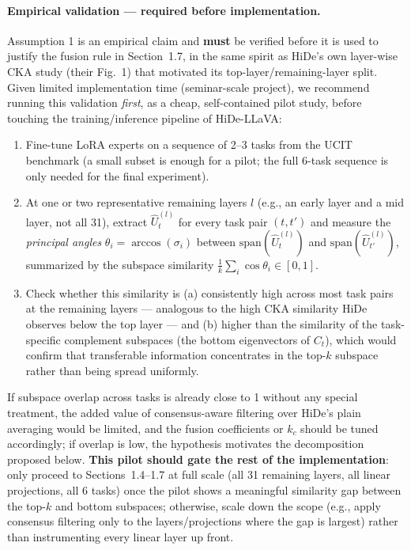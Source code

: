 \documentclass[a4paper]{article}
\begin{document}
\paragraph{Empirical validation — required before implementation.} Assumption 1 is an empirical claim and \textbf{must} be verified before it is used to justify the fusion rule in Section~1.7, in the same spirit as HiDe's own layer-wise CKA study (their Fig.~1) that motivated its top-layer/remaining-layer split. Given limited implementation time (seminar-scale project), we recommend running this validation \emph{first}, as a cheap, self-contained pilot study, before touching the training/inference pipeline of HiDe-LLaVA:
\begin{enumerate}[label=(\roman*)]
\item Fine-tune LoRA experts on a sequence of 2--3 tasks from the UCIT benchmark (a small subset is enough for a pilot; the full 6-task sequence is only needed for the final experiment).
\item At one or two representative remaining layers $l$ (e.g., an early layer and a mid layer, not all 31), extract $\hat U_t^{(l)}$ for every task pair $(t,t')$ and measure the \emph{principal angles} $\theta_i = \arccos(\sigma_i)$ between $\mathrm{span}(\hat U_t^{(l)})$ and $\mathrm{span}(\hat U_{t'}^{(l)})$, summarized by the subspace similarity $\frac1k\sum_i \cos\theta_i \in [0,1]$.
\item Check whether this similarity is (a) consistently high across most task pairs at the remaining layers — analogous to the high CKA similarity HiDe observes below the top layer — and (b) higher than the similarity of the task-specific complement subspaces (the bottom eigenvectors of $C_t$), which would confirm that transferable information concentrates in the top-$k$ subspace rather than being spread uniformly.
\end{enumerate}
If subspace overlap across tasks is already close to 1 without any special treatment, the added value of consensus-aware filtering over HiDe's plain averaging would be limited, and the fusion coefficients or $k_c$ should be tuned accordingly; if overlap is low, the hypothesis motivates the decomposition proposed below. \textbf{This pilot should gate the rest of the implementation}: only proceed to Sections~1.4--1.7 at full scale (all 31 remaining layers, all linear projections, all 6 tasks) once the pilot shows a meaningful similarity gap between the top-$k$ and bottom subspaces; otherwise, scale down the scope (e.g., apply consensus filtering only to the layers/projections where the gap is largest) rather than instrumenting every linear layer up front.
\end{document}
